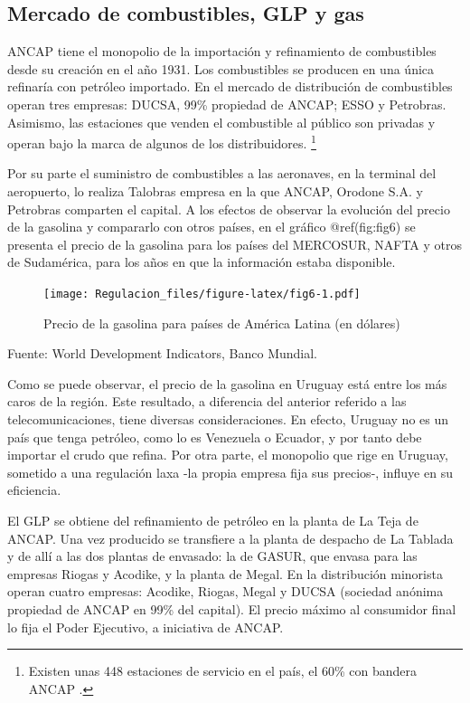 \documentclass[
  12pt,
  spanish,
]{book}
\begin{document}
\hypertarget{mercado-de-combustibles-glp-y-gas}{%
\subsection{Mercado de combustibles, GLP y
gas}\label{mercado-de-combustibles-glp-y-gas}}

ANCAP tiene el monopolio de la importación y refinamiento de
combustibles desde su creación en el año 1931. Los combustibles se
producen en una única refinaría con petróleo importado. En el mercado de
distribución de combustibles operan tres empresas: DUCSA, 99\% propiedad
de ANCAP; ESSO y Petrobras. Asimismo, las estaciones que venden el
combustible al público son privadas y operan bajo la marca de algunos de
los distribuidores. \footnote{Existen unas 448 estaciones de servicio en
  el país, el 60\% con bandera ANCAP \citep{URSEA2013}.}

Por su parte el suministro de combustibles a las aeronaves, en la
terminal del aeropuerto, lo realiza Talobras empresa en la que ANCAP,
Orodone S.A. y Petrobras comparten el capital. A los efectos de observar
la evolución del precio de la gasolina y compararlo con otros países, en
el gráfico @ref(fig:fig6) se presenta el precio de la gasolina para los
países del MERCOSUR, NAFTA y otros de Sudamérica, para los años en que
la información estaba disponible.

\begin{figure}
\centering
\texttt{[image: Regulacion\_files/figure-latex/fig6-1.pdf]}
\caption{Precio de la gasolina para países de América Latina (en
dólares)}
\end{figure}

Fuente: World Development Indicators, Banco Mundial.

Como se puede observar, el precio de la gasolina en Uruguay está entre
los más caros de la región. Este resultado, a diferencia del anterior
referido a las telecomunicaciones, tiene diversas consideraciones. En
efecto, Uruguay no es un país que tenga petróleo, como lo es Venezuela o
Ecuador, y por tanto debe importar el crudo que refina. Por otra parte,
el monopolio que rige en Uruguay, sometido a una regulación laxa -la
propia empresa fija sus precios-, influye en su eficiencia.

El GLP se obtiene del refinamiento de petróleo en la planta de La Teja
de ANCAP. Una vez producido se transfiere a la planta de despacho de La
Tablada y de allí a las dos plantas de envasado: la de GASUR, que envasa
para las empresas Riogas y Acodike, y la planta de Megal. En la
distribución minorista operan cuatro empresas: Acodike, Riogas, Megal y
DUCSA (sociedad anónima propiedad de ANCAP en 99\% del capital). El
precio máximo al consumidor final lo fija el Poder Ejecutivo, a
iniciativa de ANCAP.
\end{document}
